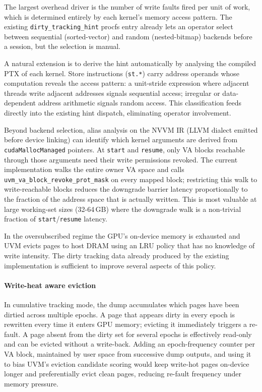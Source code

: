 

The largest overhead driver is the number of write faults fired per unit of
work, which is determined entirely by each kernel's memory access pattern.
The existing \texttt{dirty\_tracking\_hint} procfs entry already lets an
operator select between sequential (sorted-vector) and random (nested-bitmap)
backends before a session, but the selection is manual.

A natural extension is to derive the hint automatically by analysing the compiled
PTX of each kernel.
Store instructions (\texttt{st.*}) carry address operands whose computation
reveals the access pattern: a unit-stride expression where adjacent threads write
adjacent addresses signals sequential access; irregular or data-dependent address
arithmetic signals random access.
This classification feeds directly into the existing hint dispatch, eliminating
operator involvement.

Beyond backend selection, alias analysis on the NVVM IR (LLVM dialect emitted
before device linking) can identify which kernel arguments are derived from
\texttt{cudaMallocManaged} pointers.
At \texttt{start} and \texttt{resume}, only VA blocks reachable through those
arguments need their write permissions revoked.
The current implementation walks the entire owner VA space and calls
\texttt{uvm\_va\_block\_revoke\_prot\_mask} on every mapped block; restricting
this walk to write-reachable blocks reduces the downgrade barrier latency
proportionally to the fraction of the address space that is actually written.
This is most valuable at large working-set sizes (32-64\,GB) where the
downgrade walk is a non-trivial fraction of \texttt{start}/\texttt{resume}
latency.


In the oversubscribed regime the GPU's on-device memory is exhausted and UVM
evicts pages to host DRAM using an LRU policy that has no knowledge of write
intensity.
The dirty tracking data already produced by the existing implementation is
sufficient to improve several aspects of this policy.

\paragraph{Write-heat aware eviction}
In cumulative tracking mode, the dump accumulates which pages have been dirtied
across multiple epochs.
A page that appears dirty in every epoch is rewritten every time it enters GPU
memory; evicting it immediately triggers a re-fault.
A page absent from the dirty set for several epochs is effectively read-only
and can be evicted without a write-back.
Adding an epoch-frequency counter per VA block, maintained by user space
from successive dump outputs, and using it to bias UVM's eviction candidate
scoring would keep write-hot pages on-device longer and preferentially evict
clean pages, reducing re-fault frequency under memory pressure.

